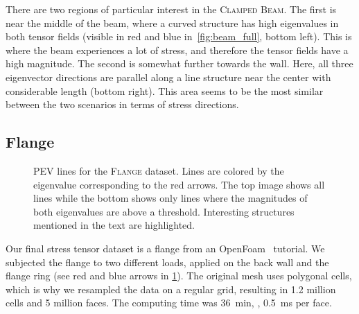 %
%

%
There are two regions of particular interest in the \textsc{Clamped Beam}.
%
The first is near the middle of the beam, where a curved structure has high
eigenvalues in both tensor fields (visible in red and blue
in~\cref{fig:beam_full}, bottom left).
%
This is where the beam experiences a lot of stress, and therefore the tensor
fields have a high magnitude.
%
The second is somewhat further towards the wall.
%
Here, all three eigenvector directions are parallel along a line structure near
the center with considerable length (bottom right).
%
This area seems to be the most similar between the two scenarios in terms of
stress directions.
%
%
\subsection{Flange} %
\label{ssub:flange}
%
\begin{figure}[p]
    \setlength\figurewidth\textwidth
    \centering
    
    \caption{\ac{PEV} lines for the \textsc{Flange} dataset. Lines are colored
             by the eigenvalue corresponding to the red arrows. The top image
             shows all lines while the bottom shows only lines where the
             magnitudes of both eigenvalues are above a threshold. Interesting
             structures mentioned in the text are highlighted.}
    \label{fig:flange_filtered}
\end{figure}
%
%
%
%
%
Our final stress tensor dataset is a flange from an OpenFoam~\cite{OpenFOAMWWW}
tutorial.
%
We subjected the flange to two different loads, applied on the back wall and the
flange ring (see red and blue arrows in \cref{fig:flange_filtered}).
%
The original mesh uses polygonal cells, which is why we resampled the data on a
regular grid, resulting in \num{1.2} million cells and \num{5} million faces.
%
The computing time was \SI{36}{\minute}, \ie{}, \SI{0.5}{\milli\second} per face.
%

